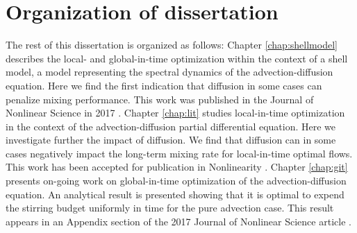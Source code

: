 %

\section{Organization of dissertation}
The rest of this dissertation is organized as follows:  Chapter \ref{chap:shellmodel} describes the local- and global-in-time optimization within the context of a shell model, a model representing the spectral dynamics of the advection-diffusion equation. Here we find the first indication that diffusion in some cases can penalize mixing performance. This work was published in the Journal of Nonlinear Science in 2017 \cite{Miles2017a}. Chapter \ref{chap:lit} studies local-in-time optimization in the context of the advection-diffusion partial differential equation. Here we investigate further the impact of diffusion. We find that diffusion can in some cases negatively impact the long-term mixing rate for local-in-time optimal flows. This work has been accepted for publication in Nonlinearity \cite{Miles2018}. Chapter \ref{chap:git} presents on-going work on global-in-time optimization of the advection-diffusion equation. An analytical result is presented showing that it is optimal to expend the stirring budget uniformly in time for the pure advection case. This result appears in an Appendix section of the 2017 Journal of Nonlinear Science article \cite{Miles2017a}.

